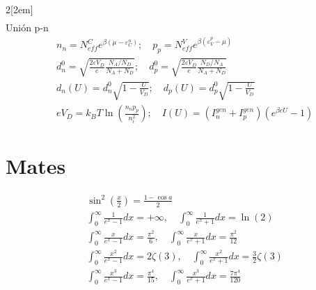\documentclass[leqno]{article}
\begin{document}
\begin{multicols}{2}[\columnsep2em]
\begin{align*}
\end{align*}
Unión p-n
\begin{align*}
  &n_n = N^C_{eff} e ^{\beta (\mu -\varepsilon _C^n)}; \quad p_p = N_{eff}^Ve ^{\beta (\varepsilon _V^p-\mu )}\\
  &d^0_n = \sqrt{ \frac{2\varepsilon V_D}{e} \frac{N_A / N_D}{N_A+N_D}}; \quad d_p^0 = \sqrt{\frac{2\varepsilon V_D}{e}\frac{N_D / N_A}{N_A+N_D}} \\
  & d_n(U) = d_n^0 \sqrt{1- \frac{U}{V_D}}; \quad d_p(U) = d_p^0 \sqrt{1- \frac{U}{V_D}}\\
  &eV_D=k_BT\ln\left( \frac{n_np_p}{n^2_i}\right); \quad I(U) = (I_n ^{gen} +I_p ^{gen})(e ^{\beta eU}-1)
\end{align*}




\section{Mates}
\begin{align*}
&\sin^2 \left(\frac{x}{2}\right) = \frac{1-\cos a}{2}\\
&\int_0^\infty \frac{1}{e^x-1}dx = +\infty, \quad \int_0^\infty \frac{1}{e^x+1}dx = \ln(2)\\
&\int_0^\infty \frac{x}{e^x-1}dx = \frac{\pi^2}{6}, \quad \int_0^\infty \frac{x}{e^x+1}dx = \frac{\pi^2}{12} \\
&\int_0^\infty \frac{x^2}{e^x-1}dx = 2\zeta(3), \quad \int_0^\infty \frac{x^2}{e^x+1}dx = \frac{3}{2}\zeta(3)\\
&\int_0^\infty \frac{x^3}{e^x-1}dx = \frac{\pi^4}{15}, \quad \int_0^\infty \frac{x^3}{e^x+1}dx = \frac{7\pi^4}{120} 
\end{align*}

\end{multicols}
\end{document}
